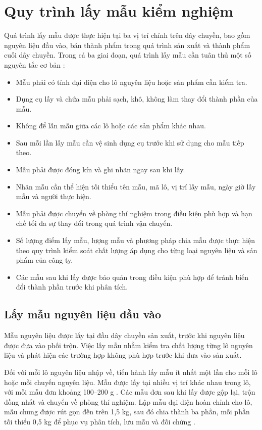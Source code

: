 \section{Quy trình lấy mẫu kiểm nghiệm}
Quá trình lấy mẫu được thực hiện tại ba vị trí chính trên dây chuyền, bao gồm nguyên liệu đầu vào, bán thành phẩm trong quá trình sản xuất và thành phẩm cuối dây chuyền\cite{company-internal-documents}. 
Trong cả ba giai đoạn, quá trình lấy mẫu cần tuân thủ một số nguyên tắc cơ bản \cite{company-internal-documents}:
\begin{itemize}
  \item Mẫu phải có tính đại diện cho lô nguyên liệu hoặc sản phẩm cần kiểm tra.
  \item Dụng cụ lấy và chứa mẫu phải sạch, khô, không làm thay đổi thành phần của mẫu.
  \item Không để lẫn mẫu giữa các lô hoặc các sản phẩm khác nhau.
  \item Sau mỗi lần lấy mẫu cần vệ sinh dụng cụ trước khi sử dụng cho mẫu tiếp theo.
  \item Mẫu phải được đóng kín và ghi nhãn ngay sau khi lấy.
  \item Nhãn mẫu cần thể hiện tối thiểu tên mẫu, mã lô, vị trí lấy mẫu, ngày giờ lấy mẫu và người thực hiện.
  \item Mẫu phải được chuyển về phòng thí nghiệm trong điều kiện phù hợp và hạn chế tối đa sự thay đổi trong quá trình vận chuyển.
  \item Số lượng điểm lấy mẫu, lượng mẫu và phương pháp chia mẫu được thực hiện theo quy trình kiểm soát chất lượng áp dụng cho từng loại nguyên liệu và sản phẩm của công ty.
  \item Các mẫu sau khi lấy được bảo quản trong điều kiện phù hợp để tránh biến đổi thành phần trước khi phân tích.
\end{itemize}

\subsection{Lấy mẫu nguyên liệu đầu vào}
Mẫu nguyên liệu được lấy tại đầu dây chuyền sản xuất, trước khi nguyên liệu được đưa vào phối trộn. 
Việc lấy mẫu nhằm kiểm tra chất lượng từng lô nguyên liệu và phát hiện các trường hợp không phù hợp trước khi đưa vào sản xuất. 

Đối với mỗi lô nguyên liệu nhập về, tiến hành lấy mẫu ít nhất một lần cho mỗi lô hoặc mỗi chuyến nguyên liệu. 
Mẫu được lấy tại nhiều vị trí khác nhau trong lô, với mỗi mẫu đơn khoảng 100--200 g \cite{company-internal-documents}.
Các mẫu đơn sau khi lấy được gộp lại, trộn đồng nhất và chuyển về phòng thí nghiệm. 
Lập mẫu đại diện hoàn chỉnh cho lô, mẫu chung được rút gọn đến trên 1,5 kg, sau đó chia thành ba phần, mỗi phần tối thiểu 0,5 kg để phục vụ phân tích, lưu mẫu và đối chứng \cite{tcvn9486-sampling}.

